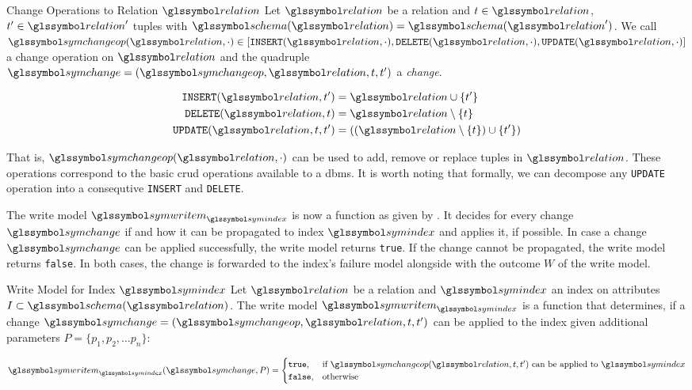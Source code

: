 \begin{definition}[label=definition:change]{Change Operations to Relation $\relation$}{}
    Let $\relation$ be a relation and $t \in \relation$, $t^{\prime} \in \relation^{\prime}$ tuples with $\schema(\relation) = \schema(\relation^{\prime})$. We call $\symchangeop(\relation,\cdot) \in [ \mathtt{INSERT}(\relation, \cdot), \mathtt{DELETE}(\relation, \cdot), \mathtt{UPDATE}(\relation, \cdot) ]$ a change operation on $\relation$ and the quadruple $\symchange = (\symchangeop, \relation, t, t^{\prime})$ a \emph{change}.

    \begin{align*}
        \mathtt{INSERT}(\relation, t^{\prime}) &= \relation \cup \lbrace t^{\prime} \rbrace \\
        \mathtt{DELETE}(\relation, t ) &= \relation \setminus \lbrace t \rbrace \\
        \mathtt{UPDATE}(\relation, t, t^{\prime}) &= ((\relation \setminus \lbrace t \rbrace) \cup \lbrace t^{\prime} \rbrace)\\
    \end{align*}

    That is, $\symchangeop(\relation,\cdot)$ can be used to add, remove or replace tuples in $\relation$. These operations correspond to the basic \acrshort{crud} operations available to a \acrshort{dbms}. It is worth noting that formally, we can decompose any \texttt{UPDATE} operation into a consequtive \texttt{INSERT} and \texttt{DELETE}.
\end{definition}

The write model $\symwritem_{\symindex}$ is now a function as given by . It decides for every change $\symchange$ if and how it can be propagated to index $\symindex$ and applies it, if possible. In case a change $\symchange$ can be applied successfully, the write model returns \texttt{true}. If the change cannot be propagated, the write model returns \texttt{false}. In both cases, the change is forwarded to the index's failure model alongside with the outcome $W$ of the write model.

\begin{definition}[label=definition:write_mode]{Write Model for Index $\symindex$}{}
    Let $\relation$ be a relation and $\symindex$ an index on attributes $I \subset \schema(\relation)$. The write model $\symwritem_{\symindex}$ is a function that determines, if a change $\symchange = (\symchangeop, \relation, t, t^{\prime})$ can be applied to the index given additional parameters $P = \{p_1, p_2, \ldots p_n\}$:

    \begin{equation*}
        \symwritem_{\symindex}(\symchange,P) = 
        \begin{cases}
           \mathtt{true}, & \text{if } \symchangeop(\relation,t,t^{\prime}) \text{ can be applied to } \symindex \\
           \mathtt{false}, & \text{otherwise}
        \end{cases}
    \end{equation*}
\end{definition}

